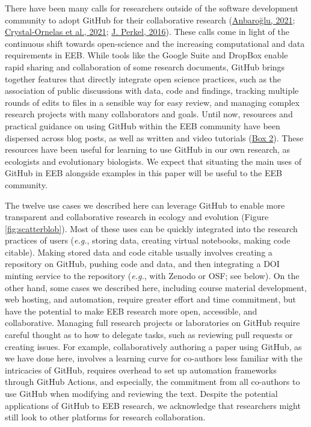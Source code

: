 There have been many calls for researchers outside of the software development community to adopt GitHub for their collaborative research (\protect\hyperlink{ref-UsTxAq4f}{Anbaroğlu, 2021}; \protect\hyperlink{ref-1Du6fzB8g}{Crystal‐Ornelas et al., 2021}; \protect\hyperlink{ref-10ghgV3S8}{J. Perkel, 2016}).
These calls come in light of the continuous shift towards open-science and the increasing computational and data requirements in EEB.
While tools like the Google Suite and DropBox enable rapid sharing and collaboration of some research documents, GitHub brings together features that directly integrate open science practices, such as the association of public discussions with data, code and findings, tracking multiple rounds of edits to files in a sensible way for easy review, and managing complex research projects with many collaborators and goals.
Until now, resources and practical guidance on using GitHub within the EEB community have been dispersed across blog posts, as well as written and video tutorials (\protect\hyperlink{tips}{Box 2}).
These resources have been useful for learning to use GitHub in our own research, as ecologists and evolutionary biologists.
We expect that situating the main uses of GitHub in EEB alongside examples in this paper will be useful to the EEB community.

The twelve use cases we described here can leverage GitHub to enable more transparent and collaborative research in ecology and evolution (Figure \ref{fig:scatterblob}).
Most of these uses can be quickly integrated into the research practices of users (\emph{e.g.}, storing data, creating virtual notebooks, making code citable).
Making stored data and code citable usually involves creating a repository on GitHub, pushing code and data, and then integrating a DOI minting service to the repository (\emph{e.g.}, with Zenodo or OSF; see below).
On the other hand, some cases we described here, including course material development, web hosting, and automation, require greater effort and time commitment, but have the potential to make EEB research more open, accessible, and collaborative.
Managing full research projects or laboratories on GitHub require careful thought as to how to delegate tasks, such as reviewing pull requests or creating issues.
For example, collaboratively authoring a paper using GitHub, as we have done here, involves a learning curve for co-authors less familiar with the intricacies of GitHub, requires overhead to set up automation frameworks through GitHub Actions, and especially, the commitment from all co-authors to use GitHub when modifying and reviewing the text.
Despite the potential applications of GitHub to EEB research, we acknowledge that researchers might still look to other platforms for research collaboration.

